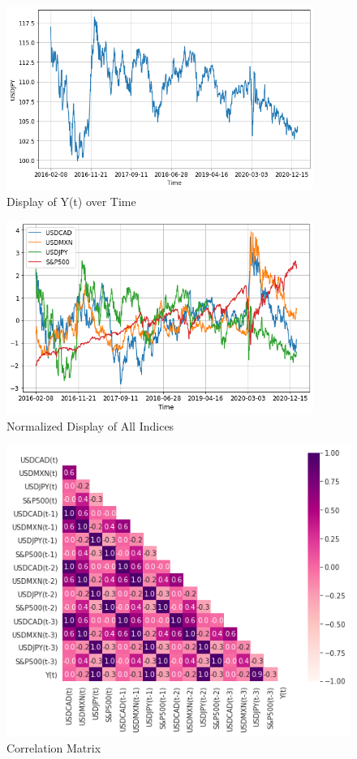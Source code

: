 \documentclass{homework}
\begin{document}
\begin{figure}[h]
    \centering
    \includegraphics[width=10cm]{hw1_yt.png}
    \caption{Display of Y(t) over Time}
    \label{yt}
\end{figure}

\begin{figure}[h]
    \centering
    \includegraphics[width=10cm]{hw1_allseries.png}
    \caption{Normalized Display of All Indices}
    \label{allseries}
\end{figure}

\begin{figure}[h]
    \centering
    \includegraphics[width=13cm]{hw1_corr.png}
    \caption{Correlation Matrix}
    \label{corr}
\end{figure}
\end{document}

